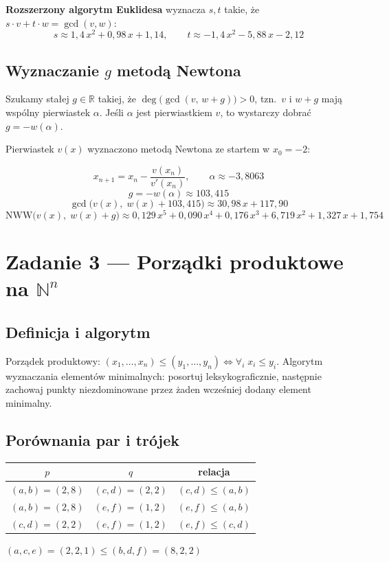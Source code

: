 \documentclass[a4paper,11pt]{article}
\begin{document}
\textbf{Rozszerzony algorytm Euklidesa} wyznacza $s, t$ takie, że $s \cdot v + t \cdot w = \gcd(v,w)$:
\[
  s \approx 1{,}4\,x^2 + 0{,}98\,x + 1{,}14, \qquad
  t \approx -1{,}4\,x^2 - 5{,}88\,x - 2{,}12
\]

\subsection*{Wyznaczanie $g$ metodą Newtona}

Szukamy stałej $g \in \mathbb{R}$ takiej, że $\deg\bigl(\gcd(v,\, w+g)\bigr) > 0$, tzn.\ $v$ i $w+g$ mają wspólny pierwiastek $\alpha$.
Jeśli $\alpha$ jest pierwiastkiem $v$, to wystarczy dobrać $g = -w(\alpha)$.

Pierwiastek $v(x)$ wyznaczono metodą Newtona ze startem w $x_0 = -2$:

\[
  x_{n+1} = x_n - \frac{v(x_n)}{v'(x_n)}, \qquad \alpha \approx -3{,}8063
\]
\[
  g = -w(\alpha) \approx 103{,}415
\]
\[
  \gcd\bigl(v(x),\; w(x) + 103{,}415\bigr) \approx 30{,}98\,x + 117{,}90
\]
\[
  \text{NWW}\bigl(v(x),\; w(x)+g\bigr) \approx 0{,}129\,x^5 + 0{,}090\,x^4 + 0{,}176\,x^3 + 6{,}719\,x^2 + 1{,}327\,x + 1{,}754
\]

\section*{Zadanie 3 --- Porządki produktowe na $\mathbb{N}^n$}

\subsection*{Definicja i algorytm}
Porządek produktowy: $(x_1,\ldots,x_n) \leq (y_1,\ldots,y_n) \iff \forall_i\; x_i \leq y_i$.
Algorytm wyznaczania elementów minimalnych: posortuj leksykograficznie, następnie zachowaj punkty niezdominowane przez żaden wcześniej dodany element minimalny.

\subsection*{Porównania par i trójek}

\begin{center}
\begin{tabular}{ccc}
\toprule
$p$ & $q$ & relacja \\
\midrule
$(a,b)=(2,8)$ & $(c,d)=(2,2)$ & $(c,d) \leq (a,b)$ \\
$(a,b)=(2,8)$ & $(e,f)=(1,2)$ & $(e,f) \leq (a,b)$ \\
$(c,d)=(2,2)$ & $(e,f)=(1,2)$ & $(e,f) \leq (c,d)$ \\
\bottomrule
\end{tabular}
\qquad
$(a,c,e)=(2,2,1) \leq (b,d,f)=(8,2,2)$
\end{center}
\end{document}
